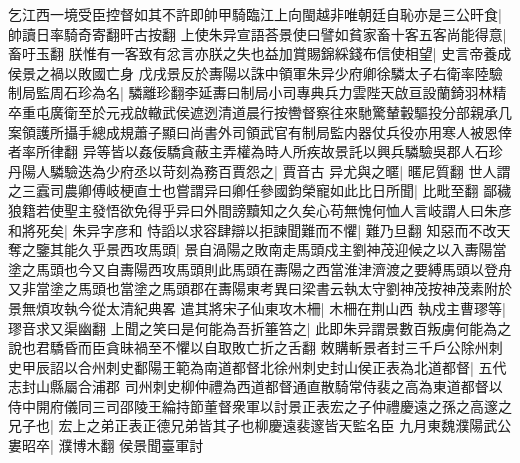 乞江西一境受臣控督如其不許即帥甲騎臨江上向閩越非唯朝廷自恥亦是三公旰食|{
	帥讀日率騎奇寄翻旰古按翻}
上使朱异宣語荅景使曰譬如貧家畜十客五客尚能得意|{
	畜吁玉翻}
朕惟有一客致有忿言亦朕之失也益加賞賜錦綵錢布信使相望|{
	史言帝養成侯景之禍以敗國亡身}
戊戌景反於夀陽以誅中領軍朱异少府卿徐驎太子右衛率陸驗制局監周石珍為名|{
	驎離珍翻李延夀曰制局小司專典兵力雲陛天啟亘設蘭錡羽林精卒重屯廣衛至於元戎啟轍武侯遮迾清道晨行按轡督察往來馳驚輦轂驅投分部親承几案領護所攝手總成規蕭子顯曰尚書外司領武官有制局監内器仗兵役亦用寒人被恩倖者率所律翻}
异等皆以姦佞驕貪蔽主弄權為時人所疾故景託以興兵驎驗吳郡人石珍丹陽人驎驗迭為少府丞以苛刻為務百賈怨之|{
	賈音古}
异尤與之暱|{
	暱尼質翻}
世人謂之三蠧司農卿傅岐梗直士也嘗謂异曰卿任參國鈞榮寵如此比日所聞|{
	比毗至翻}
鄙穢狼籍若使聖主發悟欲免得乎异曰外間謗黷知之久矣心苟無愧何恤人言岐謂人曰朱彦和將死矣|{
	朱异字彦和}
恃謟以求容肆辯以拒諫聞難而不懼|{
	難乃旦翻}
知惡而不改天奪之鑒其能久乎景西攻馬頭|{
	景自渦陽之敗南走馬頭戍主劉神茂迎候之以入夀陽當塗之馬頭也今又自夀陽西攻馬頭則此馬頭在夀陽之西當淮津濟渡之要縛馬頭以登舟又非當塗之馬頭也當塗之馬頭郡在夀陽東考異曰梁書云執太守劉神茂按神茂素附於景無煩攻執今從太清紀典畧}
遣其將宋子仙東攻木柵|{
	木柵在荆山西}
執戍主曹璆等|{
	璆音求又渠幽翻}
上聞之笑曰是何能為吾折箠笞之|{
	此即朱异謂景數百叛虜何能為之說也君驕昏而臣貪昧禍至不懼以自取敗亡折之舌翻}
敇購斬景者封三千戶公除州刺史甲辰詔以合州刺史鄱陽王範為南道都督北徐州刺史封山侯正表為北道都督|{
	五代志封山縣屬合浦郡}
司州刺史柳仲禮為西道都督通直散騎常侍裴之高為東道都督以侍中開府儀同三司邵陵王綸持節董督衆軍以討景正表宏之子仲禮慶遠之孫之高邃之兄子也|{
	宏上之弟正表正德兄弟皆其子也柳慶遠裴邃皆天監名臣}
九月東魏濮陽武公婁昭卒|{
	濮博木翻}
侯景聞臺軍討

